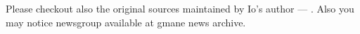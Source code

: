 \documentclass[11pt]{article}
\begin{document}
Please checkout also the original  sources maintained by
Io's author --- . Also you may notice 
newsgroup available at gmane news archive.


\end{document}
